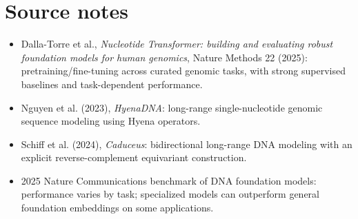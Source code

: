 \chapter*{Source notes}
\begin{itemize}
\item Dalla-Torre et al., \emph{Nucleotide Transformer: building and evaluating robust foundation models for human genomics}, Nature Methods 22 (2025): pretraining/fine-tuning across curated genomic tasks, with strong supervised baselines and task-dependent performance.
\item Nguyen et al. (2023), \emph{HyenaDNA}: long-range single-nucleotide genomic sequence modeling using Hyena operators.
\item Schiff et al. (2024), \emph{Caduceus}: bidirectional long-range DNA modeling with an explicit reverse-complement equivariant construction.
\item 2025 Nature Communications benchmark of DNA foundation models: performance varies by task; specialized models can outperform general foundation embeddings on some applications.
\end{itemize}